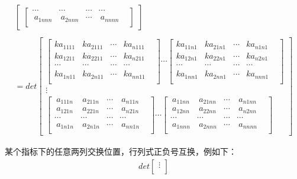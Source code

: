 \documentclass[twoside,a4paper,CCT]{cctart}   %
\begin{document}
\begin{define}
\begin{list}{}
\begin{align*}
\begin{bmatrix}
\begin{bmatrix}
  \cdots&\cdots&\cdots &\cdots& \\
\  a_{1nnn}& \  a_{2nnn}&\cdots&\  a_{nnnn}\\
\end{bmatrix}
\end{bmatrix}\\
\\
=det
  \begin{bmatrix}
  \begin{bmatrix}
 ka_{1111}& ka_{2111}&\cdots&ka_{n111}\\
 ka_{1211}& ka_{2211}&\cdots&ka_{n211}\\
  \cdots&\cdots&\cdots &\cdots& \\
ka_{1n11}& ka_{2n11}&\cdots&ka_{nn11}\\
 \end{bmatrix}
\cdots
\begin{bmatrix}
ka_{11n1}& ka_{21n1}&\cdots&ka_{n1n1}\\
ka_{12n1}& ka_{22n1}&\cdots&ka_{n2n1}\\
  \cdots&\cdots&\cdots &\cdots& \\
ka_{1nn1}& ka_{2nn1}&\cdots&ka_{nnn1}\\
\end{bmatrix}\\
\vdots\\
\begin{bmatrix}
\  a_{111n}& \  a_{211n}&\cdots&\  a_{n11n}\\
\  a_{121n}& \  a_{221n}&\cdots&\  a_{n21n}\\
  \cdots&\cdots&\cdots &\cdots& \\
\  a_{1n1n}& \  a_{2n1n}&\cdots&\  a_{nn1n}\\
\end{bmatrix}
\cdots
\begin{bmatrix}
\  a_{11nn}& \  a_{21nn}&\cdots& \  a_{n1nn}\\
\  a_{12nn}& \  a_{22nn}&\cdots&\  a_{n2nn}\\
  \cdots&\cdots&\cdots &\cdots& \\
\  a_{1nnn}& \  a_{2nnn}&\cdots& \  a_{nnnn}\\
\end{bmatrix}
\end{bmatrix}
 \end{align*}
 \item
 某个指标下的任意两列交换位置，行列式正负号互换，例如下：
\begin{align*}
det
  \begin{bmatrix}
\vdots\\

\end{bmatrix}
\end{align*}
\end{list}
\end{define}
\end{document}
